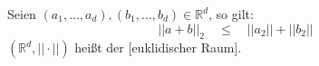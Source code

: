 Seien $(a_1, \dots, a_d), (b_1, \dots, b_d) \in \mathbb{R}^d$, so gilt:
$$||a+b||_2 \quad \leq \quad ||a_2|| + ||b_2||$$
$(\mathbb{R}^d, ||\cdot||)$ heißt der [euklidischer Raum].